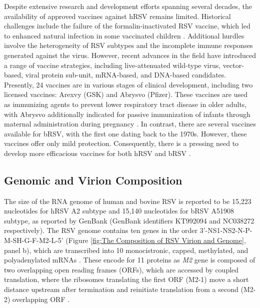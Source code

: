 Despite extensive research and development efforts spanning several decades, the availability of approved vaccines against hRSV remains limited. Historical challenges include the failure of the formalin-inactivated RSV vaccine, which led to enhanced natural infection in some vaccinated children \cite{Fulginiti1969RespiratoryVaccine., Kim1969RespiratoryVaccine.}. Additional hurdles involve the heterogeneity of RSV subtypes and the incomplete immune responses generated against the virus. However, recent advances in the field have introduced a range of vaccine strategies, including live-attenuated wild-type virus, vector-based, viral protein sub-unit, mRNA-based, and DNA-based candidates. Presently, 24 vaccines are in various stages of clinical development, including two licensed vaccines: Arexvy (GSK) and Abrysvo (Pfizer). These vaccines are used as immunizing agents to prevent lower respiratory tract disease in older adults, with Abrysvo additionally indicated for passive immunization of infants through maternal administration during pregnancy \cite{Topalidou2023RespiratoryVaccines}. In contrast, there are several vaccines available for bRSV, with the first one dating back to the 1970s. However, these vaccines offer only mild protection. Consequently, there is a pressing need to develop more efficacious vaccines for both hRSV and bRSV \cite{Ellis2017HowCattle}.

\subsection{Genomic and Virion Composition} \label{subsec:Genomic and Virion Composition}
The size of the RNA genome of human and bovine RSV is reported to be 15,223 nucleotides for hRSV A2 subtype and 15,140 nucleotides for bRSV A51908 subtype, as reported by GenBank (GenBank identifiers KT992094 and NC038272 respectively). The RSV genome contains ten genes in the order 3'-NS1-NS2-N-P-M-SH-G-F-M2-L-5' (Figure \ref{fig:The Composition of RSV Virion and Genome}, panel b), which are transcribed into 10 monocistronic, capped, methylated, and polyadenylated mRNAs \cite{Collins2013RespiratoryDisease, Bohmwald2016HumanPathology}. These encode for 11 proteins as \textit{M2} gene is composed of two overlapping open reading frames (ORFs), which are accessed by coupled translation, where the ribosomes translating the first ORF (M2-1) move a short distance upstream after termination and reinitiate translation from a second (M2-2) overlapping ORF \cite{Gould2007CouplediPneumovirinae/i}.

